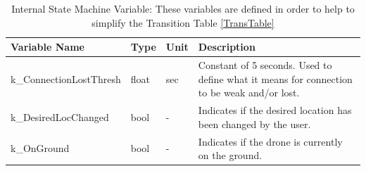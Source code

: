 \documentclass{article}
\begin{document}
\begin{table}[!h]
\begin{center}
\caption {Internal State Machine Variable: These variables are defined in order to help to simplify the Transition Table \ref{TransTable}} 
\label{tab:InternalVar}
\begin{tabular}{ | m{3cm} | m{2cm} | m{2cm} | m{6cm} | } 
\hline
 Variable Name & Type & Unit & Description \\ 
 \hline
  k_ConnectionLostThresh & float & sec & Constant of 5 seconds. Used to define what it means for connection to be weak and/or lost. \\ 
 \hline
  k_DesiredLocChanged & bool & - & Indicates if the desired location has been changed by the user.  \\ 
 \hline
 k_OnGround & bool & - & Indicates if the drone is currently on the ground.  \\ 
 \hline
\end{tabular}
\end{center}
\end{table}
\end{document}
